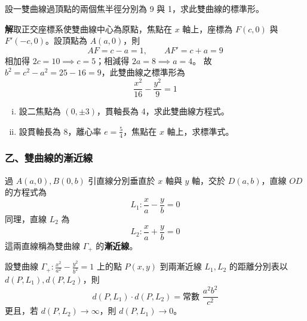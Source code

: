 \begin{example}
設一雙曲線過頂點的兩個焦半徑分別為 9 與 1，求此雙曲線的標準形。

\textbf{解}\quad 取正交座標系使雙曲線中心為原點，焦點在 $x$ 軸上，座標為 $F(c,0)$ 與 $F'(-c,0)$。設頂點為 $A(a,0)$，則
\[ AF = c - a = 1, \qquad AF' = c + a = 9 \]
相加得 $2c = 10 \implies c = 5$；相減得 $2a = 8 \implies a = 4$。
故 $b^2 = c^2 - a^2 = 25 - 16 = 9$，此雙曲線之標準形為
\[ \frac{x^2}{16} - \frac{y^2}{9} = 1 \]
\end{example}

\begin{exercise}
\begin{enumerate}[(i)]
  \item 設二焦點為 $(0, \pm 3)$，貫軸長為 4，求此雙曲線方程式。
  \item 設貫軸長為 8，離心率 $e = \frac{5}{4}$，焦點在 $x$ 軸上，求標準式。
\end{enumerate}
\end{exercise}

\subsubsection*{乙、雙曲線的漸近線}

過 $A(a,0), B(0,b)$ 引直線分別垂直於 $x$ 軸與 $y$ 軸，交於 $D(a,b)$，直線 $OD$ 的方程式為
\[ L_1 : \frac{x}{a} - \frac{y}{b} = 0 \]
同理，直線 $L_2$ 為
\[ L_2 : \frac{x}{a} + \frac{y}{b} = 0 \]
這兩直線稱為雙曲線 $\Gamma_+$ 的\textbf{漸近線}。

\begin{theorem}
設雙曲線 $\Gamma_+ : \frac{x^2}{a^2} - \frac{y^2}{b^2} = 1$ 上的點 $P(x,y)$ 到兩漸近線 $L_1, L_2$ 的距離分別表以 $d(P, L_1), d(P, L_2)$，則
\begin{equation}
d(P, L_1) \cdot d(P, L_2) = \text{常數 } \frac{a^2b^2}{c^2} \label{eq:b4s-3-2-3}
\end{equation}
更且，若 $d(P, L_2) \to \infty$，則 $d(P, L_1) \to 0$。
\end{theorem}


